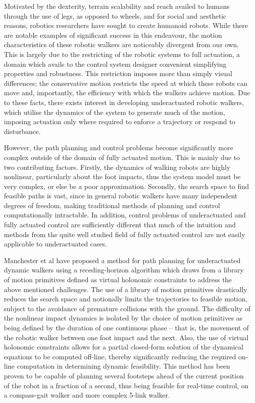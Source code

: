 Motivated by the dexterity, terrain scalability and reach availed to humans through the use of legs, as opposed to wheels, and for social and aesthetic reasons, robotics researchers have sought to create humanoid robots. While there are notable examples of significant success in this endeavour, the motion characteristics of these robotic walkers are noticeably divergent from our own. This is largely due to the restricting of the robotic systems to full actuation, a domain which avails to the control system designer convenient simplifying properties and robustness. This restriction imposes more than simply visual differences; the conservative motion restricts the speed at which these robots can move and, importantly, the efficiency with which the walkers achieve motion. Due to these facts, there exists interest in developing underactuated robotic walkers, which utilise the dynamics of the system to generate much of the motion, imposing actuation only where required to enforce a trajectory or respond to disturbance.

However, the path planning and control problems become significantly more complex outside of the domain of fully actuated motion. This is mainly due to two contributing factors. Firstly, the dynamics of walking robots are highly nonlinear, particularly about the foot impacts, thus the system model must be very complex, or else be a poor approximation. Secondly, the search space to find feasible paths is vast, since in general robotic walkers have many independent degrees of freedom, making traditional methods of planning and control computationally intractable. In addition, control problems of underactuated and fully actuated control are sufficiently different that much of the intuition and methods from the quite well studied field of fully actuated control are not easily applicable to underactuated cases.

Manchester et al \cite{manchester13planning} have proposed a method for path planning for underactuated dynamic walkers using a receding-horizon algorithm which draws from a library of motion primitives defined as virtual holonomic constraints to address the above mentioned challenges. The use of a library of motion primitives drastically reduces the search space and notionally limits the trajectories to feasible motion, subject to the avoidance of premature collisions with the ground. The difficulty of the nonlinear impact dynamics is isolated by the choice of motion primitives as being defined by the duration of one continuous phase – that is, the movement of the robotic walker between one foot impact and the next. Also, the use of virtual holonomic constraints allows for a partial closed-form solution of the dynamical equations to be computed off-line, thereby significantly reducing the required on-line computation in determining dynamic feasibility. This method has been proven to be capable of planning several footsteps ahead of the current position of the robot in a fraction of a second, thus being feasible for real-time control, on a compass-gait walker and more complex 5-link walker.

